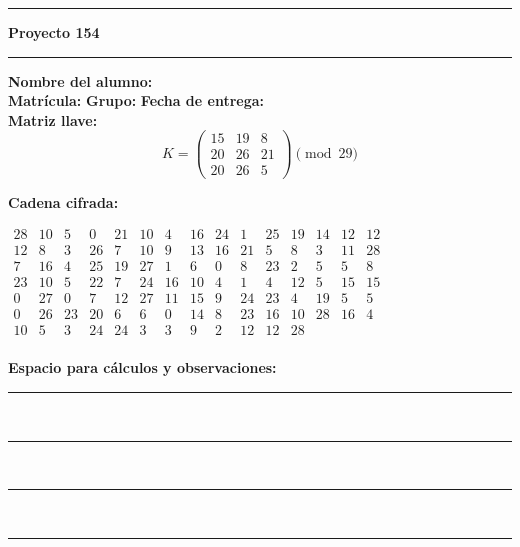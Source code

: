 \documentclass{article}%
\begin{document}
\bigskip
\hrule
\bigskip%

\textbf{Proyecto 154}\\[2pt]
\hrule
\bigskip

\textbf{Nombre del alumno:} \underline{\hspace{8cm}}\\[8pt]
\textbf{Matrícula:} \underline{\hspace{4cm}} \hspace{1cm}
\textbf{Grupo:} \underline{\hspace{2cm}} \hspace{1cm}
\textbf{Fecha de entrega:} \underline{\hspace{2.5cm}}\\[12pt]

\textbf{Matriz llave:}
\[
K = \begin{pmatrix}
15 & 19 & 8 \\
20 & 26 & 21 \\
20 & 26 & 5
\end{pmatrix} \pmod{29}
\]

\textbf{Cadena cifrada:}
\begin{center}
$\begin{array}{lllllllllllllll}
28 & 10 & 5 & 0 & 21 & 10 & 4 & 16 & 24 & 1 & 25 & 19 & 14 & 12 & 12\\
12 & 8 & 3 & 26 & 7 & 10 & 9 & 13 & 16 & 21 & 5 & 8 & 3 & 11 & 28\\
7 & 16 & 4 & 25 & 19 & 27 & 1 & 6 & 0 & 8 & 23 & 2 & 5 & 5 & 8\\
23 & 10 & 5 & 22 & 7 & 24 & 16 & 10 & 4 & 1 & 4 & 12 & 5 & 15 & 15\\
0 & 27 & 0 & 7 & 12 & 27 & 11 & 15 & 9 & 24 & 23 & 4 & 19 & 5 & 5\\
0 & 26 & 23 & 20 & 6 & 6 & 0 & 14 & 8 & 23 & 16 & 10 & 28 & 16 & 4\\
10 & 5 & 3 & 24 & 24 & 3 & 3 & 9 & 2 & 12 & 12 & 28\\
\end{array}$
\end{center}

\bigskip
\textbf{Espacio para cálculos y observaciones:}\\[6pt]
\rule{\linewidth}{0.4pt}\\[10pt]
\rule{\linewidth}{0.4pt}\\[10pt]
\rule{\linewidth}{0.4pt}\\[10pt]
\rule{\linewidth}{0.4pt}\\[10pt]
%
\end{document}
